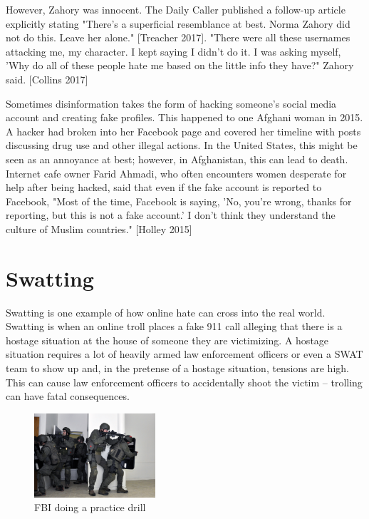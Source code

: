 \documentclass[class=book, crop=false]{standalone}
\begin{document}
However, Zahory was innocent. The Daily Caller published a follow-up article explicitly stating "There's a superficial resemblance at best. Norma Zahory did not do this. Leave her alone." [Treacher 2017]. "There were all these usernames attacking me, my character. I kept saying I didn't do it. I was asking myself, 'Why do all of these people hate me based on the little info they have?" Zahory said. [Collins 2017]

Sometimes disinformation takes the form of hacking someone's social media account and creating fake profiles. This happened to one Afghani woman in 2015. A hacker had broken into her Facebook page and covered her timeline with posts discussing drug use and other illegal actions. In the United States, this might be seen as an annoyance at best; however, in Afghanistan, this can lead to death. Internet cafe owner Farid Ahmadi, who often encounters women desperate for help after being hacked, said that even if the fake account is reported to Facebook, "Most of the time, Facebook is saying, 'No, you're wrong, thanks for reporting, but this is not a fake account.' I don't think they understand the culture of Muslim countries." [Holley 2015]

\section{Swatting}

Swatting is one example of how online hate can cross into the real world. Swatting is when an online troll places a fake 911 call alleging that there is a hostage situation at the house of someone they are victimizing. A hostage situation requires a lot of heavily armed law enforcement officers or even a SWAT team to show up and, in the pretense of a hostage situation, tensions are high. This can cause law enforcement officers to accidentally shoot the victim -- trolling can have fatal consequences.

\begin{figure} %
    \centering
    \includegraphics[width=0.4\textwidth]{FBI}
    \caption{FBI doing a practice drill}
\end{figure}
\end{document}
